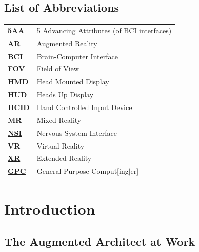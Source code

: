 \documentclass[logo,bsc,singlespacing,parskip]{infthesis}
\begin{document}
\begin{preliminary}

\chapter*{List of Abbreviations}
\label{sec:orgf93255d}
\begin{center}
\begin{tabular}{ll}
\textbf{\hyperref[org2644eb5]{5AA}} & 5 Advancing Attributes (of BCI interfaces)\\
\textbf{AR} & Augmented Reality\\
\textbf{BCI} & \hyperref[org75a7ab5]{Brain-Computer Interface}\\
\textbf{FOV} & Field of View\\
\textbf{HMD} & Head Mounted Display\\
\textbf{HUD} & Heads Up Display\\
\textbf{\hyperref[org0c83164]{HCID}} & Hand Controlled Input Device\\
\textbf{MR} & Mixed Reality\\
\textbf{\hyperref[orgf403bf3]{NSI}} & Nervous System Interface\\
\textbf{VR} & Virtual Reality\\
\textbf{\hyperref[org39cbd51]{XR}} & Extended Reality\\
\textbf{\hyperref[org6ef4753]{GPC}} & General Purpose Comput[ing\(\vert{}\)er]\\
\end{tabular}

\end{center}

\setcounter{tocdepth}{1}
\tableofcontents
{}
\listoffigures
\listoftables
\end{preliminary}


\part*{Introduction}
\label{sec:org5455afd}
\chapter*{The Augmented Architect at Work}
\label{sec:org88a012c}
\end{document}
